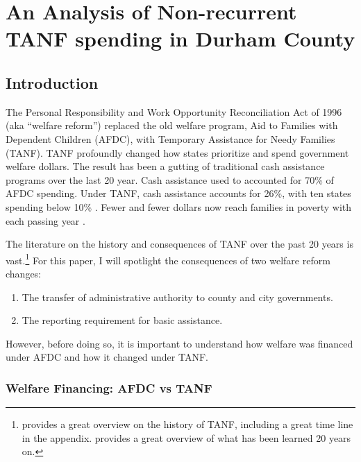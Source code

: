 \documentclass[12pt,letterpaperpaper,]{book}
\providecommand{\tightlist}{%
  \setlength{\itemsep}{0pt}\setlength{\parskip}{0pt}}
\begin{document}
\chapter{An Analysis of Non-recurrent TANF spending in Durham
County}\label{chapter-3}

\section*{Introduction}\label{intro-3}

The Personal Responsibility and Work Opportunity Reconciliation Act of
1996 (aka ``welfare reform'') replaced the old welfare program, Aid to
Families with Dependent Children (AFDC), with Temporary Assistance for
Needy Families (TANF). TANF profoundly changed how states prioritize and
spend government welfare dollars. The result has been a gutting of
traditional cash assistance programs over the last 20 year. Cash
assistance used to accounted for 70\% of AFDC spending. Under TANF, cash
assistance accounts for 26\%, with ten states spending below 10\%
\citep{schott_how_2015}. Fewer and fewer dollars now reach families in
poverty with each passing year \citep{cbpp_chart_2016}.

The literature on the history and consequences of TANF over the past 20
years is vast.\footnote{\citet{ziliak_temporary_2015} provides a great
  overview on the history of TANF, including a great time line in the
  appendix. \citet{blank_what_2007} provides a great overview of what
  has been learned 20 years on.} For this paper, I will spotlight the
consequences of two welfare reform changes:

\begin{enumerate}
\def\labelenumi{\arabic{enumi}.}
\tightlist
\item
  The transfer of administrative authority to county and city
  governments.
\item
  The reporting requirement for basic assistance.
\end{enumerate}

However, before doing so, it is important to understand how welfare was
financed under AFDC and how it changed under TANF.

\subsection*{Welfare Financing: AFDC vs
TANF}\label{welfare-financing-afdc-vs-tanf}
\end{document}
